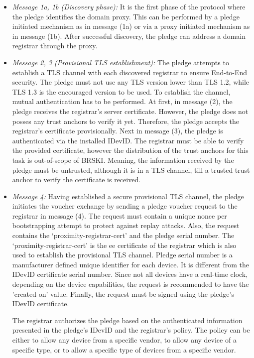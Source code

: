 \begin{itemize}
	\item \textit{Message 1a, 1b (Discovery phase):} It is the first phase of the protocol where the pledge identifies the domain proxy. This can be performed by a pledge initiated mechanism as in message (1a) or via a proxy initiated mechanism as in message (1b). After successful discovery, the pledge can address a domain registrar through the proxy.

	\item \textit{Message 2, 3 (Provisional TLS establishment):} The pledge attempts to establish a TLS channel with each discovered registrar to ensure End-to-End security. The pledge must not use any TLS version lower than TLS 1.2, while TLS 1.3 is the encouraged version to be used. To establish the channel, mutual authentication has to be performed.
	At first, in message (2), the pledge receives the registrar's server certificate. However, the pledge does not posses any trust anchors to verify it yet. Therefore, the pledge accepts the registrar's certificate provisionally.
	Next in message (3), the pledge is authenticated via the installed IDevID. The registrar must be able to verify the provided certificate, however the distribution of the trust anchors for this task is out-of-scope of BRSKI.
	Meaning, the information received by the pledge must be untrusted, although it is in a TLS channel, till a trusted trust anchor to verify the certificate is received. 

	\item \textit{Message 4:} Having established a secure provisional TLS channel, the pledge initiates the voucher exchange by sending a pledge voucher request to the registrar in message (4). The request must contain a unique nonce per bootstrapping attempt to protect against replay attacks. Also, the request contains the `proximity-registrar-cert' and the pledge serial number.
	The `proximity-registrar-cert' is the \gls{ee} certificate of the registrar which is also used to establish the provisional TLS channel. Pledge serial number is a manufacturer defined unique identifier for each device. It is different from the IDevID certificate serial number. Since not all devices have a real-time clock, depending on the device capabilities, the request is recommended to have the 'created-on' value. Finally, the request must be signed using the pledge's IDevID certificate.
	\par
	The registrar authorizes the pledge based on the authenticated information presented in the pledge's IDevID and the registrar's policy. The policy can be either to allow any device from a specific vendor, to allow any device of a specific type, or to allow a specific type of devices from a specific vendor.
	

\end{itemize}
